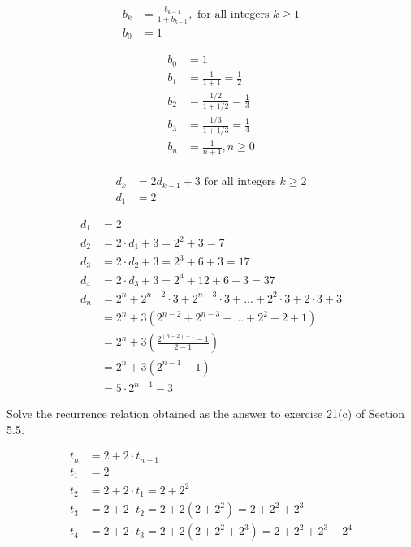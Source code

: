 \documentclass[12pt,letterpaper, onecolumn]{exam}
\begin{document}
	\begin{questions}
			\setcounter{question}{3} \question \begin{align*}
				b_k&=\frac{b_{k-1}}{1+b_{k-1}}, \textrm{ for all integers $k\geq1$}\\
				b_0&=1
			\end{align*}
			\begin{solution}
			\begin{align*}
				b_0&=1\\
				b_1&=\frac{1}{1+1}=\frac{1}{2}\\
				b_2&=\frac{1/2}{1+1/2}=\frac{1}{3}\\
				b_3&=\frac{1/3}{1+1/3}=\frac{1}{4}\\
				b_n&=\frac{1}{n+1}, n\geq0\\
			\end{align*}
			\end{solution}
					\setcounter{question}{5} \question \begin{align*}
			d_k&=2d_{k-1}+3 \textrm{ for all integers $k\geq2$}\\
			d_1&=2
		\end{align*}
			\begin{solution}
			\begin{align*}
				d_1&=2\\
				d_2&=2\cdot d_1+3=2^2+3=7\\
				d_3&=2\cdot d_2+3=2^3+6+3=17\\
				d_4&=2\cdot d_3 +3=2^4+12+6+3=37\\
				d_n&=2^n+2^{n-2}\cdot3+2^{n-3}\cdot3+...+2^2\cdot3+2\cdot3+3\\
				&=2^n+3(2^{n-2}+2^{n-3}+...+2^2+2+1)\\
				&=2^n+3\left(\frac{2^{(n-2)+1}-1}{2-1}\right)\\
				&=2^n+3(2^{n-1}-1)\\
				&=5\cdot2^{n-1}-3
			\end{align*}
		\end{solution}
	\setcounter{question}{16}\question Solve the recurrence relation obtained as the answer to exercise 21(c) of Section 5.5.
	\begin{solution}
	\begin{align*}
		t_n&=2+2\cdot t_{n-1}\\
		t_1&=2\\
		t_2&=2+2\cdot t_1=2+2^2\\
		t_3&=2+2\cdot t_2 = 2+2(2+2^2)=2+2^2+2^3\\
		t_4&=2+2\cdot t_3=2+2(2+2^2+2^3)=2+2^2+2^3+2^4\\

\end{align*}
\end{solution}
\end{questions}
\end{document}
